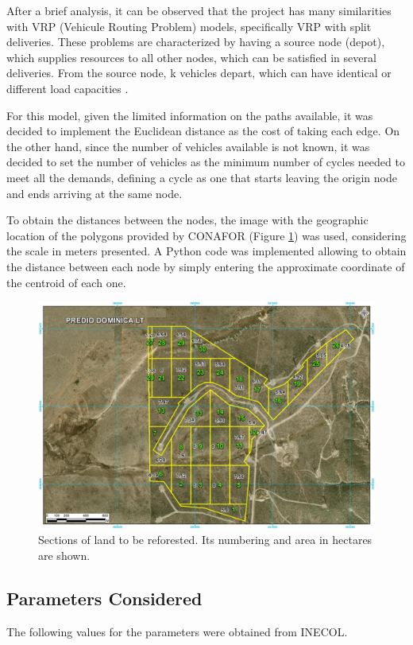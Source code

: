 \documentclass{amsart}
\begin{document}
    After a brief analysis, it can be observed that the project has many similarities with VRP (Vehicule Routing Problem) models, specifically VRP with split deliveries. These problems are characterized by having a source node (depot), which supplies resources to all other nodes, which can be satisfied in several deliveries. From the source node, k vehicles depart, which can have identical or different load capacities \parencite{Dror}.
    
    For this model, given the limited information on the paths available, it was decided to implement the Euclidean distance as the cost of taking each edge. On the other hand, since the number of vehicles available is not known, it was decided to set the number of vehicles as the minimum number of cycles needed to meet all the demands, defining a cycle as one that starts leaving the origin node and ends arriving at the same node. 

    To obtain the distances between the nodes, the image with the geographic location of the polygons provided by CONAFOR (Figure \ref{fig:tablaDePoligonos}) was used, considering the scale in meters presented. A Python code was implemented allowing to obtain the distance between each node by simply entering the approximate coordinate of the centroid of each one.
        
        \begin{figure}[ht]
            \centering
            \includegraphics[width=0.5\linewidth]{Sources/Poligonos.png}
            \caption{Sections of land to be reforested. Its numbering and area in hectares are shown.}
            \label{fig:tablaDePoligonos}
        \end{figure}
    
    \subsection{Parameters Considered}
    
    The following values for the parameters were obtained from INECOL.
    
\end{document}
